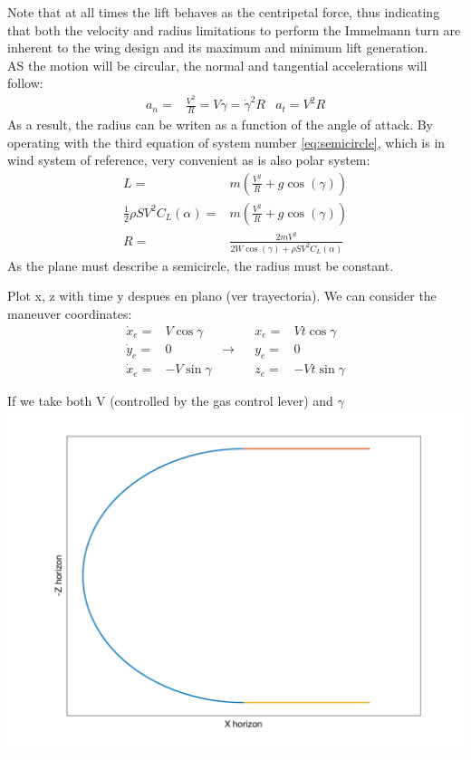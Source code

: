 Note that at all times the lift behaves as the centripetal force, thus indicating that both the velocity and radius limitations to perform the Immelmann turn are inherent to the wing design and its maximum and minimum lift generation.\\
AS the motion will be circular, the normal and tangential accelerations will follow:
\begin{align*}
	a_n=&\frac{V^2}{R}=V\dot{\gamma}=\dot{\gamma}^2R&a_t=V^2R
\end{align*}
As a result, the radius can be writen as a function of the angle of attack. By operating with the third equation of system number \ref{eq:semicircle}, which is in wind system of reference, very convenient as is also polar system:
\begin{align*}
	L=&m\left(\frac{V^2}{R}+g\cos(\gamma)\right)\\
	\frac{1}{2}\rho S V^2 C_L(\alpha)=&m\left(\frac{V^2}{R}+g\cos(\gamma)\right)\\
	R=&\frac{2mV^2}{2W\cos(\gamma)+\rho S V^2 C_L(\alpha)}
\end{align*}
As the plane must describe a semicircle, the radius must be constant.

Plot x, z with time y despues en plano (ver trayectoria).
We can consider the maneuver coordinates:
\begin{align*}
	\dot{x}_e=&V\cos\gamma&&&	x_e=&Vt\cos\gamma \\
	\dot{y}_e=&0& \rightarrow&&	y_e=&0\\
	\dot{x}_e=&-V\sin\gamma&&&z_e=&-Vt\sin\gamma
\end{align*}

If we take both V (controlled by the gas control lever) and $\gamma$ 
\includegraphics[width=\linewidth]{../matlab/trajectory.png}